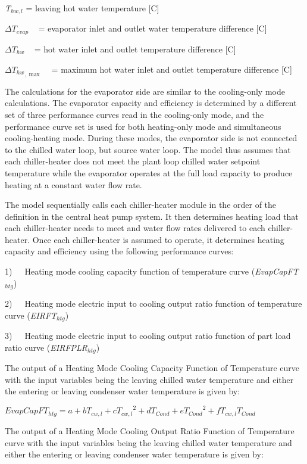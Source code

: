 \emph{T\(_{hw,l}\)} = leaving hot water temperature {[}C{]}

\(\Delta {T_{evap}}\) ~ = evaporator inlet and outlet water temperature difference {[}C{]}

\(\Delta {T_{hw}}\) ~ = hot water inlet and outlet temperature difference {[}C{]}

\(\Delta {T_{hw}}_{,\max }\) ~ = maximum hot water inlet and outlet temperature difference {[}C{]}

The calculations for the evaporator side are similar to the cooling-only mode calculations. The evaporator capacity and efficiency is determined by a different set of three performance curves read in the cooling-only mode, and the performance curve set is used for both heating-only mode and simultaneous cooling-heating mode. During these modes, the evaporator side is not connected to the chilled water loop, but source water loop. The model thus assumes that each chiller-heater does not meet the plant loop chilled water setpoint temperature while the evaporator operates at the full load capacity to produce heating at a constant water flow rate.

The model sequentially calls each chiller-heater module in the order of the definition in the central heat pump system. It then determines heating load that each chiller-heater needs to meet and water flow rates delivered to each chiller-heater. Once each chiller-heater is assumed to operate, it determines heating capacity and efficiency using the following performance curves:

1)~~~Heating mode cooling capacity function of temperature curve (\emph{EvapCapFT\(_{htg}\)})

2)~~~Heating mode electric input to cooling output ratio function of temperature curve (\emph{EIRFT\(_{htg}\)})

3)~~~Heating mode electric input to cooling output ratio function of part load ratio curve (\emph{EIRFPLR\(_{htg}\)})

The output of a Heating Mode Cooling Capacity Function of Temperature curve with the input variables being the leaving chilled water temperature and either the entering or leaving condenser water temperature is given by:

\textbf{\emph{\(EvapCapF{T_{htg}} = a + b{T_{cw,l}} + c{T_{cw,l}}^2 + d{T_{Cond}} + e{T_{Cond}}^2 + f{T_{cw,l}}{T_{Cond}}\)}}

The output of a Heating Mode Cooling Output Ratio Function of Temperature curve with the input variables being the leaving chilled water temperature and either the entering or leaving condenser water temperature is given by:

